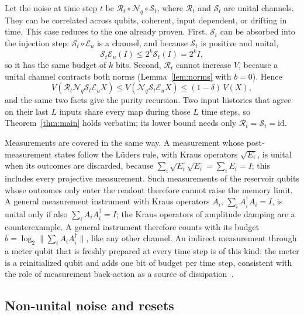 \documentclass[aps,prl,twocolumn,superscriptaddress,floatfix]{revtex4-2}
\theoremstyle{plain}
\newcommand{\Norm}[1]{\lVert #1\rVert}
\newcommand{\cE}{\mathcal E}
\newcommand{\Nq}{\mathcal N_q}
\begin{document}
Let the noise at time step $t$ be $\mathcal R_t\circ\Nq\circ\mathcal S_t$, where $\mathcal R_t$ and $\mathcal S_t$ are unital channels. They can be correlated across qubits, coherent, input dependent, or drifting in time. This case reduces to the one already proven. First, $\mathcal S_t$ can be absorbed into the injection step: $\mathcal S_t\circ\cE_u$ is a channel, and because $\mathcal S_t$ is positive and unital,
\[
\mathcal S_t\cE_u(I)\le2^k\mathcal S_t(I)=2^kI,
\]
so it has the same budget of $k$ bits. Second, $\mathcal R_t$ cannot increase $V$, because a unital channel contracts both norms (Lemma~\ref{lem:norms} with $b=0$). Hence
\[
V(\mathcal R_t\Nq\mathcal S_t\cE_uX)\le V(\Nq\mathcal S_t\cE_uX)\le(1-\delta)\,V(X),
\]
and the same two facts give the purity recursion. Two input histories that agree on their last $L$ inputs share every map during those $L$ time steps, so Theorem~\ref{thm:main} holds verbatim; its lower bound needs only $\mathcal R_t=\mathcal S_t=\mathrm{id}$.

Measurements are covered in the same way. A measurement whose post-measurement states follow the L\"uders rule, with Kraus operators $\sqrt{E_i}$, is unital when its outcomes are discarded, because $\sum_i\sqrt{E_i}\sqrt{E_i}=\sum_iE_i=I$; this includes every projective measurement. Such measurements of the reservoir qubits whose outcomes only enter the readout therefore cannot raise the memory limit. A general measurement instrument with Kraus operators $A_i$, $\sum_iA_i^\dagger A_i=I$, is unital only if also $\sum_iA_iA_i^\dagger=I$; the Kraus operators of amplitude damping are a counterexample. A general instrument therefore counts with its budget $b=\log_2\Norm{\sum_iA_iA_i^\dagger}$, like any other channel. An indirect measurement through a meter qubit that is freshly prepared at every time step is of this kind: the meter is a reinitialized qubit and adds one bit of budget per time step, consistent with the role of measurement back-action as a source of dissipation~\cite{MorguiSancho2026}.

\subsection{Non-unital noise and resets}
\end{document}
